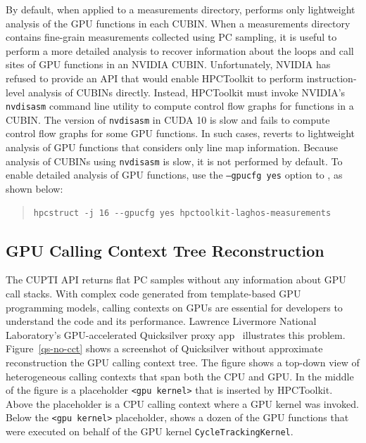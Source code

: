 By default, when applied to a measurements directory, \hpcstruct{} performs only lightweight analysis of the GPU functions in each CUBIN. When a measurements directory contains fine-grain measurements collected using PC sampling, it is useful to perform a more detailed analysis to recover information about the loops and call sites of GPU functions in an NVIDIA CUBIN. Unfortunately, NVIDIA has refused to provide an API that would enable HPCToolkit to perform instruction-level analysis of CUBINs directly. Instead, HPCToolkit must invoke NVIDIA's {\tt nvdisasm} command line utility to compute control flow graphs for functions in a CUBIN. The version of {\tt nvdisasm} in CUDA 10 is slow and fails to compute control flow graphs for some GPU functions. In such cases, \hpcstruct{} reverts to lightweight analysis of GPU functions that considers only line map information. Because analysis of CUBINs using {\tt nvdisasm} is slow, it is not performed by default. To enable detailed analysis of GPU functions, use the {\tt --gpucfg yes} option to \hpcstruct{}, as shown below:

\begin{quote}
\begin{verbatim}
hpcstruct -j 16 --gpucfg yes hpctoolkit-laghos-measurements
\end{verbatim}
\end{quote}


\subsection{GPU Calling Context Tree Reconstruction}
\label{nvidia-cct}



The CUPTI API returns flat PC samples without any information about GPU call stacks.
With complex code generated from template-based GPU programming models, calling contexts on GPUs are essential for developers to understand the code and its performance. Lawrence Livermore National Laboratory's GPU-accelerated Quicksilver proxy app~\cite{quicksilver} illustrates this problem. Figure~\ref{qs-no-cct} shows a \hpcviewer{} screenshot of Quicksilver without approximate reconstruction the GPU calling context tree. The figure shows a top-down view of heterogeneous calling contexts that span both the CPU and GPU. In the middle of the figure is a placeholder \verb|<gpu kernel>| that is inserted by HPCToolkit. Above the placeholder is a CPU calling context where a GPU kernel was invoked. Below the \verb|<gpu kernel>| placeholder, \hpcviewer{} shows a dozen of the GPU functions that were executed on behalf of the GPU kernel \verb|CycleTrackingKernel|. 

